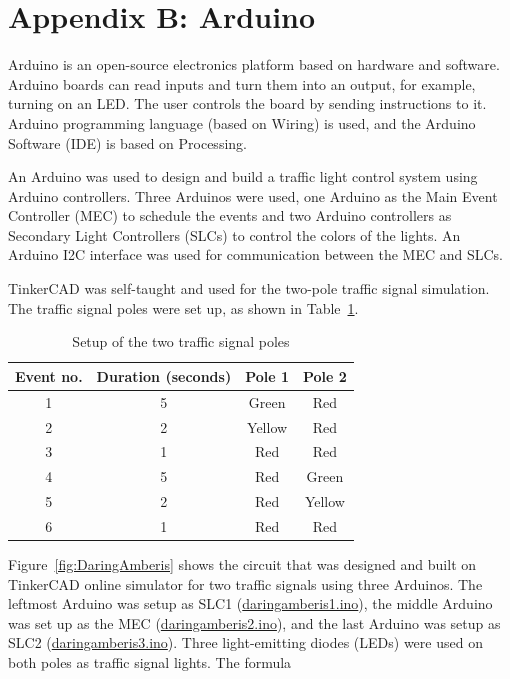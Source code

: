 \documentclass[12pt,a4paper]{report}
\begin{document}
{{\section{Appendix B: Arduino}

Arduino is an open-source electronics platform based on hardware and software. Arduino boards can read inputs and turn them into an output, for example, turning on an LED. The user controls the board by sending instructions to it. Arduino programming language (based on Wiring) is used, and the Arduino Software (IDE) is based on Processing.	

An Arduino was used to design and build a  traffic light control system using Arduino controllers. Three Arduinos were used, one Arduino as the Main Event Controller (MEC) to schedule the events and two Arduino controllers as Secondary Light Controllers (SLCs) to control the colors of the lights. An Arduino I2C interface was used for communication between the MEC and SLCs.

TinkerCAD was self-taught and used for the two-pole traffic signal simulation. The traffic signal poles were set up, as shown in Table~\ref*{table:1}.

\begin{table}[h!]
	\centering
	\begin{tabular}{| c | c | c | c |} 
		\hline
		Event no. & Duration (seconds) & Pole 1 & Pole 2 \\
		\hline
		1  &  5  & Green & Red  \\
		\hline
		2 & 2 & Yellow & Red  \\
		\hline
		3 & 1 & Red & Red \\
		\hline
		4  &  5  & Red & Green  \\
		\hline
		5 & 2 & Red & Yellow  \\
		\hline
		6 & 1 & Red & Red \\
		\hline
	\end{tabular}
	\caption{Setup of the two traffic signal poles}
	\label{table:1}
\end{table}

Figure~\ref*{fig:DaringAmberis} shows the circuit that was designed and built on TinkerCAD online simulator for two traffic signals using three Arduinos. The leftmost Arduino was setup as SLC1 (\href{https://github.com/Casablanca25273/Worksheet}{daring\textunderscore amberis1.ino}), the middle Arduino was set up as the MEC (\href{https://github.com/Casablanca25273/Worksheet}{daring\textunderscore amberis2.ino}), and the last Arduino was setup as SLC2 (\href{https://github.com/Casablanca25273/Worksheet}{daring\textunderscore amberis3.ino}). Three light-emitting diodes (LEDs) were used on both poles as traffic signal lights. The formula 

}}
\end{document}
